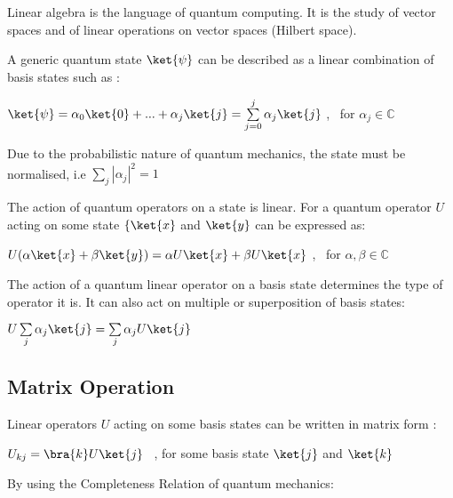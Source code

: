 \documentclass{article}
\begin{document}
\noindent
Linear algebra is the language of quantum computing. It is the study of vector spaces and of linear operations on vector
spaces (Hilbert space).
\vspace{5mm}

\noindent
A generic quantum state $\ket{\psi}$ can be described as a linear combination of basis states such as \cite{noauthor_lecture_nodate}:
\vspace{5mm}


\qquad $\ket{\psi} = \alpha_0\ket{0} + ... + \alpha_j\ket{j} = \sum\limits_{j = 0}^{j} \alpha_j\ket{j}$ , \ for $\alpha_j \in \mathbb{C}$
\vspace{5mm}

\noindent
Due to the probabilistic nature of quantum mechanics, the state must be normalised, i.e $\sum\limits_j |\alpha_j|^2 = 1$
\vspace{5mm}

\noindent
The action of quantum operators on a state is linear. For a quantum operator $U$ acting on some state $\{\ket{x}$ and $\ket{y}$ can be expressed as:
\vspace{5mm}

\noindent
\qquad $U(\alpha\ket{x} + \beta\ket{y}) = \alpha U\ket{x} + \beta U\ket{x}$ , \ for $\alpha, \beta \in \mathbb{C}$
\vspace{5mm}

\noindent
The action of a quantum linear operator on a basis state determines the type of operator it is. It can also act on multiple or superposition of basis states:
\vspace{5mm}

\noindent
\qquad $U \sum\limits_j \alpha_j \ket{j} = \sum\limits_j \alpha_j U\ket{j}$
\vspace{10mm}

\subsection{Matrix Operation}
\vspace{5mm}

\noindent
Linear operators $U$ acting on some basis states can be written in matrix form \cite{noauthor_lecture_nodate}:
\vspace{5mm}

\qquad $U_{kj} = \bra{k}U\ket{j}$ \ , for some basis state $\ket{j}$ and $\ket{k}$
\vspace{5mm}

\noindent
By using the Completeness Relation of quantum mechanics:
\vspace{5mm}
\end{document}
